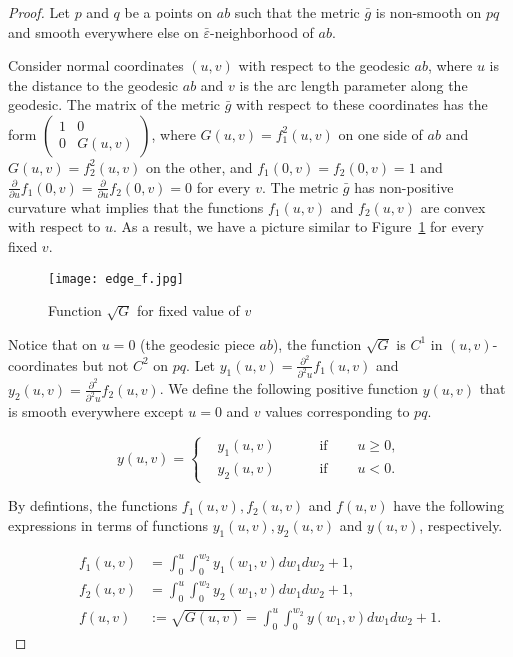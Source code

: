 \documentclass[12pt]{article}
\numberwithin{equation}{section}
\theoremstyle{definition}
\newcommand{\eps}{\varepsilon}
\begin{document}
\begin{proof}
Let $p$ and $q$ be a points on $ab$ such that the metric $\bar g$ is non-smooth on $pq$ and smooth everywhere else on $\bar\eps$-neighborhood of $ab$.

Consider normal coordinates $(u,v)$ with respect to the geodesic $ab$, where $u$ is the distance to the geodesic $ab$ and $v$ is the arc length parameter along the geodesic. The matrix of the metric $\bar g$ with respect to these coordinates has the form $\left(\begin{array}{cc} 1 & 0\\ 0 & G(u, v)\end{array}\right)$, where $G(u,v)=f_1^2(u,v)$ on one side of $ab$ and $G(u,v) = f_2^2(u,v)$ on the other, and $f_1(0,v)=f_2(0,v)=1$ and $\frac{\partial}{\partial u}f_1(0,v)=\frac{\partial}{\partial u}f_2(0,v)=0$ for every $v$. The metric $\bar g$ has non-positive curvature what implies that the functions $f_1(u,v)$ and $f_2(u,v)$ are convex with respect to $u$. As a result, we have a picture similar to Figure~\ref{fig:pict_graph} for every fixed $v$.

\begin{figure}
  \centering
     \texttt{[image: edge\_f.jpg]}
    \caption{Function $\sqrt{G}$ for fixed value of $v$}
    \label{fig:pict_graph}
\end{figure}

Notice that  on $u=0$ (the geodesic piece $ab$), the function $\sqrt{G}$ is $C^1$ in $(u,v)$-coordinates but not $C^2$ on $pq$.  
Let $y_1(u,v) = \frac{\partial^2}{\partial^2 u}f_1(u,v)$ and $y_2(u,v) = \frac{\partial^2}{\partial^2 u}f_2(u,v)$. We define the following positive function $y(u,v)$ that is smooth everywhere except $u=0$ and $v$ values corresponding to $pq$. 

\[
y(u,v) = \left\{
  \begin{aligned}
    & y_1(u,v) \qquad& \text{ if } \quad &u\geqslant 0,\\
    & y_2(u,v) \qquad& \text{ if } \quad &u<0.
  \end{aligned} \right.
\]

By defintions, the functions $f_1(u,v), f_2(u,v)$ and $f(u,v)$ have the following expressions in terms of functions $y_1(u,v), y_2(u,v)$ and $y(u,v)$, respectively.

\begin{align*}
f_1(u,v) &= \int_0^u\int_0^{w_2}y_1(w_1,v)dw_1dw_2 + 1, \\
f_2(u,v) &= \int_0^u\int_0^{w_2} y_2(w_1,v)dw_1dw_2 + 1, \\
f(u,v)&:=\sqrt {G(u,v)} = \int_0^u\int_0^{w_2} y(w_1,v)dw_1dw_2 + 1.
\end{align*}


\end{proof}
\end{document}
